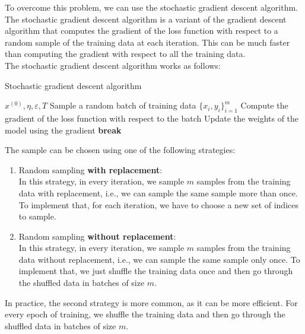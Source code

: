 To overcome this problem, we can use the stochastic gradient descent algorithm. The stochastic
gradient descent algorithm is a variant of the gradient descent algorithm that computes the
gradient of the loss function with respect to a random sample of the training data at each
iteration. This can be much faster than computing the gradient with respect to all the training
data.\\

The stochastic gradient descent algorithm works as follows:

\begin{algorithm}[H]
    \caption{Stochastic gradient descent algorithm}
    \begin{algorithmic}[1]
        \Require $x^{(0)}, \eta, \varepsilon, T$
            \State Sample a random batch of training data $\{ x_i, y_i \}_{i=1}^m$
            \State Compute the gradient of the loss function with respect to the batch
            \State Update the weights of the model using the gradient
                \State \textbf{break}
            \EndIf
        \EndFor
    \end{algorithmic}
\end{algorithm}

The sample can be chosen using one of the following strategies:

\begin{enumerate}
    \item Random sampling \textbf{with replacement}:\\
    In this strategy, in every iteration, we sample $m$ samples from the training data with replacement,
    i.e., we can sample the same sample more than once. To implement that, for each iteration, we have
    to choose a new set of indices to sample.

    \item Random sampling \textbf{without replacement}:\\
    In this strategy, in every iteration, we sample $m$ samples from the training data without replacement,
    i.e., we can sample the same sample only once. To implement that, we just shuffle the training data
    once and then go through the shuffled data in batches of size $m$.
\end{enumerate}

In practice, the second strategy is more common, as it can be more efficient. For every epoch of
training, we shuffle the training data and then go through the shuffled data in batches of size $m$.\\

